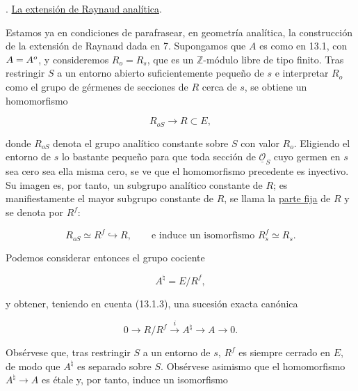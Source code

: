
\medskip
{}. \underline{La extensión de Raynaud analítica}.

Estamos ya en condiciones de parafrasear, en geometría analítica, la
construcción de la extensión de Raynaud dada en 7. Supongamos que $A$ es
como en 13.1, con $A=\sisi{A_o}{A^o}$, y consideremos $R_o=R_s$, que es
un $\mathbb Z$-módulo libre de tipo finito. Tras restringir $S$ a un
entorno abierto suficientemente pequeño de $s$ e interpretar $R_o$ como
el grupo de gérmenes de secciones de $R$ cerca de $s$, se obtiene un
homomorfismo

\begin{equation}\tag{13.3.1}
 R_{oS}\longrightarrow R\subset E,
\end{equation}

\noindent
donde $R_{oS}$ denota el grupo analítico constante sobre $S$ con valor
$R_o$. Eligiendo el entorno de $s$ lo bastante pequeño para que toda
sección de $\underline{\mathcal O}_S$ cuyo germen en $s$ sea cero sea
ella misma cero, se ve que el homomorfismo precedente es inyectivo. Su
imagen es, por tanto, un subgrupo analítico constante de $R$; es
manifiestamente el mayor subgrupo constante de $R$, se llama la
\underline{parte fija} de $R$ y se denota por $R^f$:


\begin{equation}\tag{13.3.2}
 R_{oS}\simeq R^f\hookrightarrow R,
 \qquad\text{e induce un isomorfismo }R_s^f\simeq R_s.
\end{equation}

\noindent
Podemos considerar entonces el grupo cociente

\begin{equation}\tag{13.3.3}
 A^\natural=E/R^f,
\end{equation}

\noindent
y obtener, teniendo en cuenta (13.1.3), una sucesión exacta canónica

\begin{equation}\tag{13.3.4}
 0\longrightarrow R/R^f\stackrel{i}{\longrightarrow}A^\natural
 \longrightarrow A\longrightarrow0.
\end{equation}

\noindent
Obsérvese que, tras restringir $S$ a un entorno de $s$, $R^f$ es siempre
cerrado en $E$, de modo que $A^\natural$ es separado sobre $S$.
Obsérvese asimismo que el homomorfismo
$A^\natural\longrightarrow A$ es étale y, por tanto, induce un
isomorfismo

